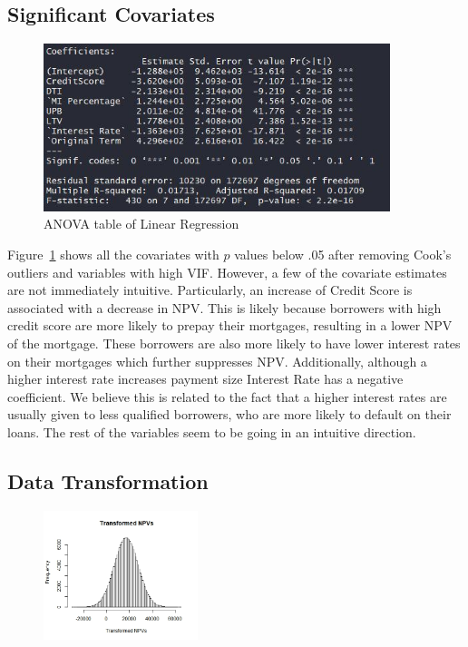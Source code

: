 \documentclass[12 pt]{uncw_thesis}
\theoremstyle{plain}
\theoremstyle{remark}
\theoremstyle{definition}
\begin{document}
\subsection{Significant Covariates}
\begin{figure}
	\includegraphics[width=0.9\textwidth]{images/ANOVA.jpg}
	\caption{ANOVA table of Linear Regression}
	\label{fig:ANOVA}
\end{figure}
Figure~\ref{fig:ANOVA} shows all the covariates with $p$ values below .05 after removing Cook's outliers and variables with high VIF. However, a few of the covariate estimates are not immediately intuitive. Particularly, an increase of Credit Score is associated with a decrease in NPV. This is likely because borrowers with high credit score are more likely to prepay their mortgages, resulting in a lower NPV of the mortgage. These borrowers are also more likely to have lower interest rates on their mortgages which further suppresses NPV. Additionally, although a higher interest rate increases payment size Interest Rate has a negative coefficient. We believe this is related to the fact that a higher interest rates are usually given to less qualified borrowers, who are more likely to default on their loans. The rest of the variables seem to be going in an intuitive direction. 

\subsection{Data Transformation}
\begin{figure}
	\vspace{-2\normalbaselineskip}
	\centering
	\includegraphics[width=0.4\textwidth]{images/Transformed.jpeg}
	\vspace{-\normalbaselineskip}
\end{figure}
\end{document}
